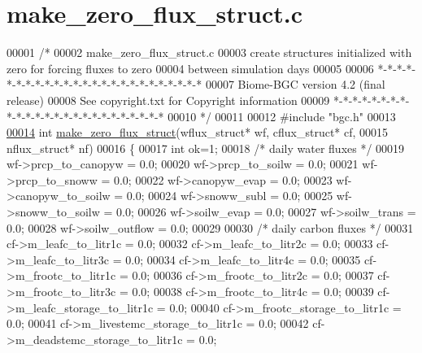 \hypertarget{make__zero__flux__struct_8c_source}{}\section{make\+\_\+zero\+\_\+flux\+\_\+struct.\+c}
\label{make__zero__flux__struct_8c_source}

\begin{DoxyCode}
00001 \textcolor{comment}{/* }
00002 \textcolor{comment}{make\_zero\_flux\_struct.c}
00003 \textcolor{comment}{create structures initialized with zero for forcing fluxes to zero}
00004 \textcolor{comment}{between simulation days}
00005 \textcolor{comment}{}
00006 \textcolor{comment}{*-*-*-*-*-*-*-*-*-*-*-*-*-*-*-*-*-*-*-*-*-*-*-*-*}
00007 \textcolor{comment}{Biome-BGC version 4.2 (final release)}
00008 \textcolor{comment}{See copyright.txt for Copyright information}
00009 \textcolor{comment}{*-*-*-*-*-*-*-*-*-*-*-*-*-*-*-*-*-*-*-*-*-*-*-*-*}
00010 \textcolor{comment}{*/}
00011 
00012 \textcolor{preprocessor}{#include "bgc.h"}
00013 
\hypertarget{make__zero__flux__struct_8c_source_l00014}{}\hyperlink{make__zero__flux__struct_8c_a22aa2b538ae817627f4d4eae85cb3993}{00014} \textcolor{keywordtype}{int} \hyperlink{make__zero__flux__struct_8c_a22aa2b538ae817627f4d4eae85cb3993}{make\_zero\_flux\_struct}(wflux\_struct* wf, cflux\_struct* cf,
00015 nflux\_struct* nf)
00016 \{
00017     \textcolor{keywordtype}{int} ok=1;
00018     \textcolor{comment}{/* daily water fluxes */}
00019     wf->prcp\_to\_canopyw = 0.0;
00020     wf->prcp\_to\_soilw = 0.0;
00021     wf->prcp\_to\_snoww = 0.0;
00022     wf->canopyw\_evap = 0.0;
00023     wf->canopyw\_to\_soilw = 0.0;
00024     wf->snoww\_subl = 0.0;
00025     wf->snoww\_to\_soilw = 0.0;
00026     wf->soilw\_evap = 0.0;
00027     wf->soilw\_trans = 0.0;
00028     wf->soilw\_outflow = 0.0;
00029     
00030     \textcolor{comment}{/* daily carbon fluxes */}
00031     cf->m\_leafc\_to\_litr1c = 0.0;
00032     cf->m\_leafc\_to\_litr2c = 0.0;
00033     cf->m\_leafc\_to\_litr3c = 0.0;
00034     cf->m\_leafc\_to\_litr4c = 0.0;
00035     cf->m\_frootc\_to\_litr1c = 0.0;
00036     cf->m\_frootc\_to\_litr2c = 0.0;
00037     cf->m\_frootc\_to\_litr3c = 0.0;
00038     cf->m\_frootc\_to\_litr4c = 0.0;
00039     cf->m\_leafc\_storage\_to\_litr1c = 0.0;
00040     cf->m\_frootc\_storage\_to\_litr1c = 0.0;
00041     cf->m\_livestemc\_storage\_to\_litr1c = 0.0;
00042     cf->m\_deadstemc\_storage\_to\_litr1c = 0.0;

\end{DoxyCode}
